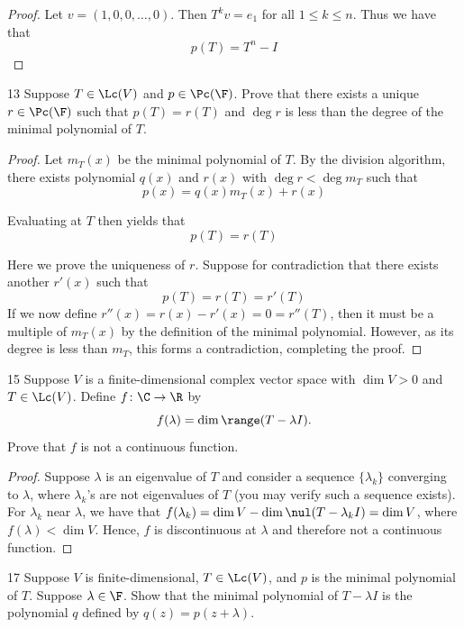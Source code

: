 \documentclass{extarticle}
\begin{document}
\begin{proof}
Let \(v = (1, 0, 0, \ldots, 0)\). Then \(T^k v = e_1\) for all \(1 \leq k \leq n\). Thus we have that 
\[p(T) = T^n - I\]
\end{proof}

\begin{problem}{13}
    Suppose \(T \in \Lc(V)\) and \(p \in \Pc(\F)\). Prove that there exists a unique \(r \in \Pc(\F)\)
    such that \(p(T) = r(T)\) and \(\deg r\) is less than the degree of the minimal polynomial 
    of \(T\). 
\end{problem}

\begin{proof}
Let \(m_T(x)\) be the minimal polynomial of \(T\). By the division algorithm, there exists polynomial 
\(q(x)\) and \(r(x)\) with \(\deg r < \deg m_T\) such that 
\[p(x) = q(x)m_T(x) + r(x)\]

Evaluating at \(T\) then yields that 
\[p(T) = r(T)\]

Here we prove the uniqueness of \(r\). Suppose for contradiction that there exists another \(r'(x)\) such 
that 
\[p(T) = r(T) = r'(T)\]
If we now define \(r''(x) = r(x) - r'(x) = 0 = r''(T)\), then it must be a multiple of \(m_T(x)\) by the definition 
of the minimal polynomial. However, as its degree is less than \(m_T\), this forms a contradiction, 
completing the proof. 
\end{proof}

\begin{problem}{15}
    Suppose \(V\) is a finite-dimensional complex vector space with \(\dim V > 0\) and \(T \in \Lc(V)\). 
    Define \(f \colon \C \to \R\) by 
    \[f(\lambda) = \dim \range(T - \lambda I).\]
    Prove that \(f\) is not a continuous function. 
\end{problem}

\begin{proof}
Suppose \(\lambda\) is an eigenvalue of \(T\) and consider a sequence \(\{\lambda_k\}\) converging to \(\lambda\), 
where \(\lambda_k\)'s are not eigenvalues of \(T\) (you may verify such a sequence exists). For \(\lambda_k\) near \(\lambda\), we have that 
\(f(\lambda_k) = \dim V - \dim \nul (T - \lambda_k I) = \dim V\), where \(f(\lambda) < \dim V\). Hence, \(f\) 
is discontinuous at \(\lambda\) and therefore not a continuous function. 
\end{proof}

\begin{problem}{17}
    Suppose \(V\) is finite-dimensional, \(T \in \Lc(V)\), and \(p\) is the minimal polynomial of \(T\). 
    Suppose \(\lambda \in \F\). Show that the minimal polynomial of \(T - \lambda I\) is the polynomial 
    \(q\) defined by \(q(z) = p(z + \lambda)\). 
\end{problem}
\end{document}
